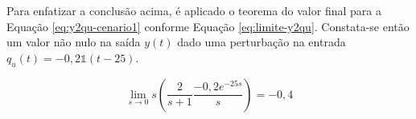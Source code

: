 Para enfatizar a conclusão acima, é aplicado o teorema do valor final para a
Equação \ref{eq:y2qu-cenario1} conforme Equação \ref{eq:limite-y2qu}.
Constata-se então um valor não nulo na saída $y(t)$ dado uma perturbação na
entrada $q_{u}(t) = -0,2\mathds{1}(t - 25)$.

\begin{equation}
    \label{eq:limite-y2qu}
    \lim_{s \rightarrow 0}s\left ( \frac{2}{s + 1}\frac{-0,2e^{-25s}}{s} \right ) = -0,4
\end{equation}